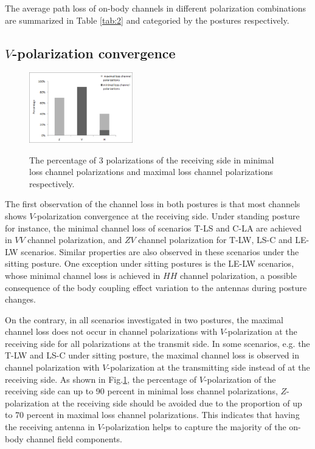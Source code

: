 \documentclass[conference]{IEEEtran}
\begin{document}
The average path loss of on-body channels in different polarization combinations are summarized in Table \ref{tab:2} and categoried by the postures respectively.

\subsection{$V$-polarization convergence}

\begin{figure}[!t]
  \centering
  \includegraphics[width=0.4\textwidth]{figs/6.eps}\\
  \caption{The percentage of 3 polarizations of the receiving side in minimal loss channel polarizations and maximal loss channel polarizations respectively.}
  \label{fig:polarization percentage}
\end{figure}

The first observation of the channel loss in both postures is that most channels shows $V$-polarization convergence at the receiving side. Under standing posture for instance,  the minimal channel loss of scenarios T-LS and C-LA are achieved in $VV$ channel polarization, and $ZV$ channel polarization for T-LW, LS-C and LE-LW scenarios. Similar properties are also observed in these scenarios under the sitting posture. One exception under sitting postures is the LE-LW scenarios, whose minimal channel loss is achieved in $HH$ channel polarization, a possible consequence of the body coupling effect variation to the antennas during posture changes.

On the contrary, in all scenarios investigated in two postures, the maximal channel loss does not occur in channel polarizations with $V$-polarization at the receiving side for all polarizations at the transmit side.  In some scenarios, e.g. the T-LW and LS-C under sitting posture, the maximal channel loss is observed in channel polarization with $V$-polarization at the transmitting side instead of at the receiving side. As shown in Fig.\ref{fig:polarization percentage}, the percentage of $V$-polarization of the receiving side can up to 90 percent in minimal loss channel polarizations, $Z$-polarization at the receiving side should be avoided due to the proportion of up to 70 percent in maximal loss channel polarizations. This indicates that having the receiving antenna in $V$-polarization helps to capture the majority of the on-body channel field components.
\end{document}
